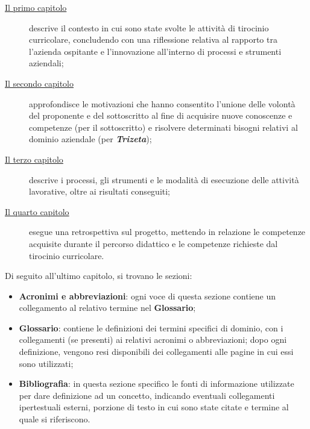 \begin{description}
    \item[{\hyperref[cap:contesto-svolgimento]{Il primo capitolo}}] descrive il contesto in cui sono state svolte le attività di tirocinio curricolare, concludendo con una riflessione relativa al rapporto tra l'azienda ospitante e l'innovazione all'interno di processi e strumenti aziendali; 
    \item[{\hyperref[cap:motivazioni-tirocinio]{Il secondo capitolo}}] approfondisce le motivazioni che hanno consentito l'unione delle volontà del proponente e del sottoscritto al fine di acquisire nuove conoscenze e competenze (per il sottoscritto) e risolvere determinati bisogni relativi al dominio aziendale (per \textbf{\textit{Trizeta}});
    \item[{\hyperref[cap:elementi-progetto]{Il terzo capitolo}}] descrive i processi, gli strumenti e le modalità di esecuzione delle attività lavorative, oltre ai risultati conseguiti;
    \item[{\hyperref[cap:resoconto]{Il quarto capitolo}}] esegue una retrospettiva sul progetto, mettendo in relazione le competenze acquisite durante il percorso didattico e le competenze richieste dal tirocinio curricolare.
\end{description}

Di seguito all'ultimo capitolo, si trovano le sezioni:
\begin{itemize}
    \item \textbf{Acronimi e abbreviazioni}: ogni voce di questa sezione contiene un collegamento al relativo termine nel \textbf{Glossario};
    \item \textbf{Glossario}: contiene le definizioni dei termini specifici di dominio, con i collegamenti (se presenti) ai relativi acronimi o abbreviazioni; dopo ogni definizione, vengono resi disponibili dei collegamenti alle pagine in cui essi sono utilizzati;
    \item \textbf{Bibliografia}: in questa sezione specifico le fonti di informazione utilizzate per dare definizione ad un concetto, indicando eventuali collegamenti ipertestuali esterni, porzione di testo in cui sono state citate e termine al quale si riferiscono.
\end{itemize}

